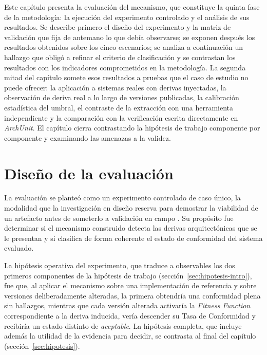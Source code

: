 
Este capítulo presenta la evaluación del mecanismo, que constituye la quinta fase de la metodología: la ejecución del experimento controlado y el análisis de sus resultados. Se describe primero el diseño del experimento y la matriz de validación que fija de antemano lo que debía observarse; se exponen después los resultados obtenidos sobre los cinco escenarios; se analiza a continuación un hallazgo que obligó a refinar el criterio de clasificación y se contrastan los resultados con los indicadores comprometidos en la metodología. La segunda mitad del capítulo somete esos resultados a pruebas que el caso de estudio no puede ofrecer: la aplicación a sistemas reales con derivas inyectadas, la observación de deriva real a lo largo de versiones publicadas, la calibración estadística del umbral, el contraste de la extracción con una herramienta independiente y la comparación con la verificación escrita directamente en \textit{ArchUnit}. El capítulo cierra contrastando la hipótesis de trabajo componente por componente y examinando las amenazas a la validez.

\section{Diseño de la evaluación}
La evaluación se planteó como un experimento controlado de caso único, la modalidad que la investigación en diseño reserva para demostrar la viabilidad de un artefacto antes de someterlo a validación en campo \citep{Hevner2004, Peffers2007}. Su propósito fue determinar si el mecanismo construido detecta las derivas arquitectónicas que se le presentan y si clasifica de forma coherente el estado de conformidad del sistema evaluado.

La hipótesis operativa del experimento, que traduce a observables los dos primeros componentes de la hipótesis de trabajo (sección~\ref{sec:hipotesis-intro}), fue que, al aplicar el mecanismo sobre una implementación de referencia y sobre versiones deliberadamente alteradas, la primera obtendría una conformidad plena sin hallazgos, mientras que cada versión alterada activaría la \textit{Fitness Function} correspondiente a la deriva inducida, vería descender su Tasa de Conformidad y recibiría un estado distinto de \textit{aceptable}. La hipótesis completa, que incluye además la utilidad de la evidencia para decidir, se contrasta al final del capítulo (sección~\ref{sec:hipotesis}).

